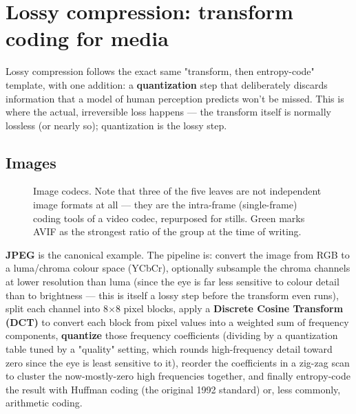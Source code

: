 \documentclass[11pt]{article}
\begin{document}
\section{Lossy compression: transform coding for media}

Lossy compression follows the exact same "transform, then entropy-code" template, with one addition: a \textbf{quantization} step that deliberately discards information that a model of human perception predicts won't be missed. This is where the actual, irreversible loss happens — the transform itself is normally lossless (or nearly so); quantization is the lossy step.

\subsection{Images}

\begin{figure}[h]
\centering
{}
\caption{Image codecs. Note that three of the five leaves are not independent image formats at all — they are the intra-frame (single-frame) coding tools of a video codec, repurposed for stills. Green marks AVIF as the strongest ratio of the group at the time of writing.}
\end{figure}

\textbf{JPEG} is the canonical example. The pipeline is: convert the image from RGB to a luma/chroma colour space (YCbCr), optionally subsample the chroma channels at lower resolution than luma (since the eye is far less sensitive to colour detail than to brightness — this is itself a lossy step before the transform even runs), split each channel into 8$\times$8 pixel blocks, apply a \textbf{Discrete Cosine Transform (DCT)} to convert each block from pixel values into a weighted sum of frequency components, \textbf{quantize} those frequency coefficients (dividing by a quantization table tuned by a "quality" setting, which rounds high-frequency detail toward zero since the eye is least sensitive to it), reorder the coefficients in a zig-zag scan to cluster the now-mostly-zero high frequencies together, and finally entropy-code the result with Huffman coding (the original 1992 standard) or, less commonly, arithmetic coding.
\end{document}
